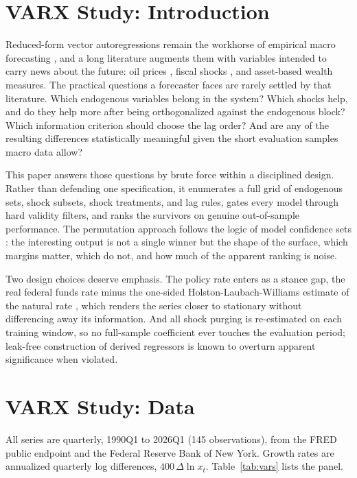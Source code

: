 \documentclass[conference]{IEEEtran}
\begin{document}
\section{VARX Study: Introduction}
Reduced-form vector autoregressions remain the workhorse of empirical macro forecasting \cite{sims1980}, and a long literature augments them with variables intended to carry news about the future: oil prices \cite{kilian2008}, fiscal shocks \cite{ramey2011}, and asset-based wealth measures. The practical questions a forecaster faces are rarely settled by that literature. Which endogenous variables belong in the system? Which shocks help, and do they help more after being orthogonalized against the endogenous block? Which information criterion should choose the lag order? And are any of the resulting differences statistically meaningful given the short evaluation samples macro data allow?

This paper answers those questions by brute force within a disciplined design. Rather than defending one specification, it enumerates a full grid of endogenous sets, shock subsets, shock treatments, and lag rules, gates every model through hard validity filters, and ranks the survivors on genuine out-of-sample performance. The permutation approach follows the logic of model confidence sets \cite{hln2011}: the interesting output is not a single winner but the shape of the surface, which margins matter, which do not, and how much of the apparent ranking is noise.

Two design choices deserve emphasis. The policy rate enters as a stance gap, the real federal funds rate minus the one-sided Holston-Laubach-Williams estimate of the natural rate \cite{hlw2023}, which renders the series closer to stationary without differencing away its information. And all shock purging is re-estimated on each training window, so no full-sample coefficient ever touches the evaluation period; leak-free construction of derived regressors is known to overturn apparent significance when violated.

\section{VARX Study: Data}
All series are quarterly, 1990Q1 to 2026Q1 (145 observations), from the FRED public endpoint and the Federal Reserve Bank of New York. Growth rates are annualized quarterly log differences, $400\,\Delta \ln x_t$. Table~\ref{tab:vars} lists the panel.
\end{document}
